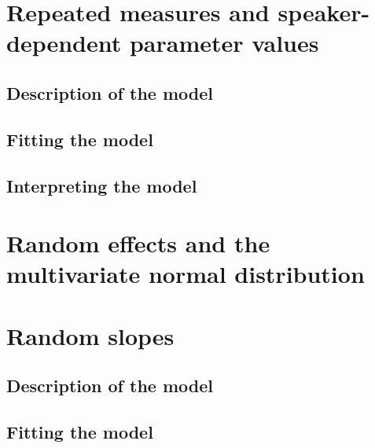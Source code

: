 \documentclass[
]{book}
\begin{document}
\hypertarget{repeated-measures-and-speaker-dependent-parameter-values}{%
\section{Repeated measures and speaker-dependent parameter values}\label{repeated-measures-and-speaker-dependent-parameter-values}}

\hypertarget{description-of-the-model-7}{%
\subsection{Description of the model}\label{description-of-the-model-7}}

\hypertarget{fitting-the-model-6}{%
\subsection{Fitting the model}\label{fitting-the-model-6}}

\hypertarget{interpreting-the-model-4}{%
\subsection{Interpreting the model}\label{interpreting-the-model-4}}

\hypertarget{random-effects-and-the-multivariate-normal-distribution}{%
\section{Random effects and the multivariate normal distribution}\label{random-effects-and-the-multivariate-normal-distribution}}

\hypertarget{random-slopes-1}{%
\section{Random slopes}\label{random-slopes-1}}

\hypertarget{description-of-the-model-8}{%
\subsection{Description of the model}\label{description-of-the-model-8}}

\hypertarget{fitting-the-model-7}{%
\subsection{Fitting the model}\label{fitting-the-model-7}}
\end{document}
